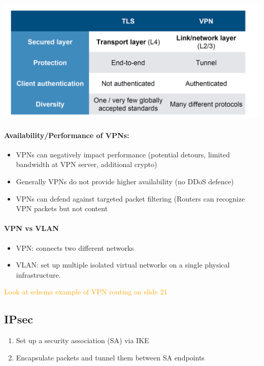 \begin{minipage}{\linewidth}
    \centering      
    \includegraphics[width=\linewidth]{Figures/VPN_tls.PNG} 
\end{minipage}

\paragraph{Availability/Performance of VPNs:}
\begin{itemize}
    \item VPNs can negatively impact performance (potential detours, limited bandwidth at VPN server, additional crypto)
    \item Generally VPNs do not provide higher availability (no DDoS defence)
    \item VPNs can defend against targeted packet filtering (Routers can recognize VPN packets but not content
\end{itemize}

\paragraph{VPN vs VLAN}
\begin{itemize}
    \item VPN: connects two different networks
    \item VLAN: set up multiple isolated virtual networks on a single physical infrastructure.
\end{itemize}

\textcolor{orange}{Look at schema example of VPN routing on slide 21}

\subsection{IPsec}

\begin{enumerate}
    \item Set up a security association (SA) via IKE
    \item Encapsulate packets and tunnel them between SA endpoints
\end{enumerate}

